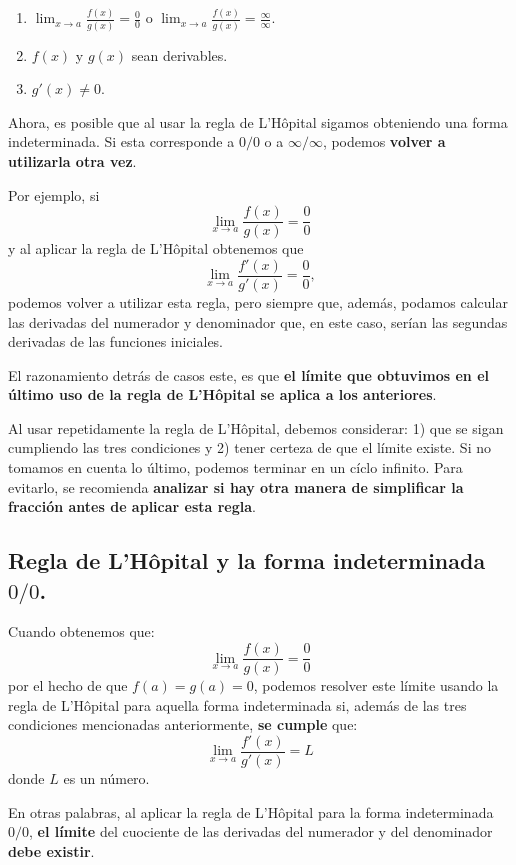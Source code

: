 \documentclass[12pt]{article}
\begin{document}
\begin{enumerate}
\item $\displaystyle \lim_{x \to a} \frac{f(x)}{g(x)} = \frac{0}{0}$ o $\displaystyle \lim_{x \to a} \frac{f(x)}{g(x)} = \frac{\infty}{\infty}$.
\item $f(x)$ y $g(x)$ sean derivables.
\item $g'(x) \neq 0$.
\end{enumerate}

Ahora, es posible que al usar la regla de L'Hôpital sigamos obteniendo una forma indeterminada. Si esta corresponde a $0/0$ o a $\infty/\infty$, podemos \textbf{volver a utilizarla otra vez}.

Por ejemplo, si
\[
  \lim_{x \to a} \frac{f(x)}{g(x)} = \frac{0}{0}
\]
y al aplicar la regla de L'Hôpital obtenemos que
\[
  \lim_{x \to a} \frac{f'(x)}{g'(x)} = \frac{0}{0},
\]
podemos volver a utilizar esta regla, pero siempre que, además, podamos calcular las derivadas del numerador y denominador que, en este caso, serían las segundas derivadas de las funciones iniciales.

El razonamiento detrás de casos este, es que \textbf{el límite que obtuvimos en el último uso de la regla de L'Hôpital se aplica a los anteriores}.

Al usar repetidamente la regla de L'Hôpital, debemos considerar: 1) que se sigan cumpliendo las tres condiciones y 2) tener certeza de que el límite existe. Si no tomamos en cuenta lo último, podemos terminar en un cíclo infinito. Para evitarlo, se recomienda \textbf{analizar si hay otra manera de simplificar la fracción antes de aplicar esta regla}.

\subsection{Regla de L'Hôpital y la forma indeterminada \texorpdfstring{$0/0$}{0/0}.}

Cuando obtenemos que:
\[
  \lim_{x \to a} \frac{f(x)}{g(x)} = \frac{0}{0}
\]
por el hecho de que $f(a) = g(a) = 0$, podemos resolver este límite usando la regla de L'Hôpital para aquella forma indeterminada si, además de las tres condiciones mencionadas anteriormente, \textbf{se cumple} que:
\[
  \lim_{x \to a} \frac{f'(x)}{g'(x)} = L
\]
donde $L$ es un número.

En otras palabras, al aplicar la regla de L'Hôpital para la forma indeterminada $0/0$, \textbf{el límite} del cuociente de las derivadas del numerador y del denominador \textbf{debe existir}.
\end{document}
